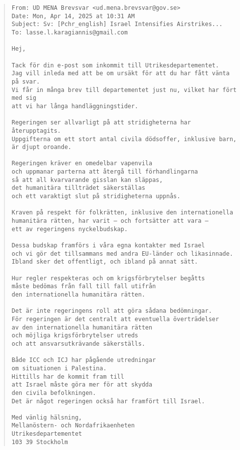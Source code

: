\begin{quote}
\begin{verbatim}
From: UD MENA Brevsvar <ud.mena.brevsvar@gov.se>
Date: Mon, Apr 14, 2025 at 10:31 AM 
Subject: Sv: [Pchr_english] Israel Intensifies Airstrikes... 
To: lasse.l.karagiannis@gmail.com

Hej,

Tack för din e-post som inkommit till Utrikesdepartementet. 
Jag vill inleda med att be om ursäkt för att du har fått vänta på svar. 
Vi får in många brev till departementet just nu, vilket har fört med sig 
att vi har långa handläggningstider.

Regeringen ser allvarligt på att stridigheterna har återupptagits. 
Uppgifterna om ett stort antal civila dödsoffer, inklusive barn, 
är djupt oroande.

Regeringen kräver en omedelbar vapenvila 
och uppmanar parterna att återgå till förhandlingarna 
så att all kvarvarande gisslan kan släppas, 
det humanitära tillträdet säkerställas 
och ett varaktigt slut på stridigheterna uppnås.

Kraven på respekt för folkrätten, inklusive den internationella 
humanitära rätten, har varit – och fortsätter att vara – 
ett av regeringens nyckelbudskap.

Dessa budskap framförs i våra egna kontakter med Israel 
och vi gör det tillsammans med andra EU-länder och likasinnade. 
Ibland sker det offentligt, och ibland på annat sätt.

Hur regler respekteras och om krigsförbrytelser begåtts 
måste bedömas från fall till fall utifrån 
den internationella humanitära rätten.

Det är inte regeringens roll att göra sådana bedömningar. 
För regeringen är det centralt att eventuella överträdelser 
av den internationella humanitära rätten 
och möjliga krigsförbrytelser utreds 
och att ansvarsutkrävande säkerställs.

Både ICC och ICJ har pågående utredningar 
om situationen i Palestina. 
Hittills har de kommit fram till 
att Israel måste göra mer för att skydda 
den civila befolkningen. 
Det är något regeringen också har framfört till Israel.

Med vänlig hälsning,
Mellanöstern- och Nordafrikaenheten 
Utrikesdepartementet 
103 39 Stockholm 
\end{verbatim}
\end{quote}

\vspace{1em}

